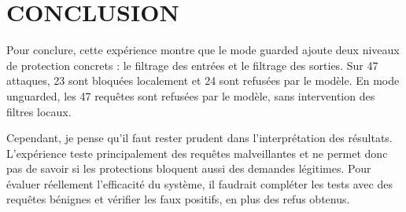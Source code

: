 \documentclass[a4paper,11pt]{article}
\begin{document}
\section*{CONCLUSION}

Pour conclure, cette expérience montre que le mode guarded ajoute deux niveaux de protection concrets : le filtrage des entrées et le filtrage des sorties. Sur 47 attaques, 23 sont bloquées localement et 24 sont refusées par le modèle. En mode unguarded, les 47 requêtes sont refusées par le modèle, sans intervention des filtres locaux.

Cependant, je pense qu’il faut rester prudent dans l’interprétation des résultats. L’expérience teste principalement des requêtes malveillantes et ne permet donc pas de savoir si les protections bloquent aussi des demandes légitimes. Pour évaluer réellement l’efficacité du système, il faudrait compléter les tests avec des requêtes bénignes et vérifier les faux positifs, en plus des refus obtenus.
\end{document}
